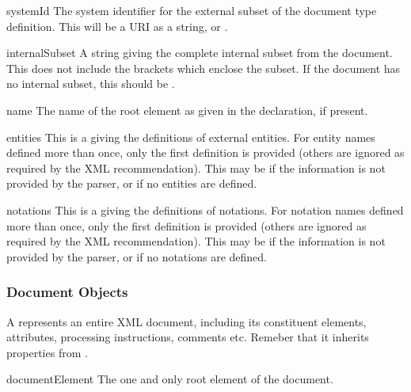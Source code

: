 \begin{memberdesc}[DocumentType]{systemId}
  The system identifier for the external subset of the document type
  definition.  This will be a URI as a string, or .
\end{memberdesc}

\begin{memberdesc}[DocumentType]{internalSubset}
  A string giving the complete internal subset from the document.
  This does not include the brackets which enclose the subset.  If the
  document has no internal subset, this should be .
\end{memberdesc}

\begin{memberdesc}[DocumentType]{name}
  The name of the root element as given in the 
  declaration, if present.
\end{memberdesc}

\begin{memberdesc}[DocumentType]{entities}
  This is a  giving the definitions of external
  entities.  For entity names defined more than once, only the first
  definition is provided (others are ignored as required by the XML
  recommendation).  This may be  if the information is not
  provided by the parser, or if no entities are defined.
\end{memberdesc}

\begin{memberdesc}[DocumentType]{notations}
  This is a  giving the definitions of notations.
  For notation names defined more than once, only the first definition
  is provided (others are ignored as required by the XML
  recommendation).  This may be  if the information is not
  provided by the parser, or if no notations are defined.
\end{memberdesc}


\subsubsection{Document Objects \label{dom-document-objects}}

A  represents an entire XML document, including its
constituent elements, attributes, processing instructions, comments
etc.  Remeber that it inherits properties from .

\begin{memberdesc}[Document]{documentElement}
The one and only root element of the document.
\end{memberdesc}

